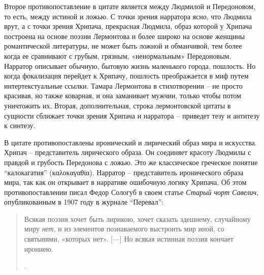 \documentclass[12pt,a4paper]{article}
\begin{document}
Второе противопоставление в цитате является между Людмилой и Передоновом, то есть, между истиной и ложью. С точки зрения нарратора ясно, что Людмила врут, а с точки зрения Хрипача, прекрасная Людмила, образ которой у Хрипача построена на основе поэзии Лермонтова и более широко на основе женщины романтической литературы, не может быть ложной и обманчивой, тем более когда ее сравнивают с грубым, грязным, «ненормальным» Передоновым. Нарратор описывает обычную, бытовую жизнь маленького города, пошлость. Но когда фокализация перейдет к Хрипачу, пошлость преображается в миф путем интертекстуальные ссылки. Тамара Лермонтова в стихотворении – не просто красивая, но также коварная, и она заманивает мужчин, только чтобы потом уничтожить их. Вторая, дополнительная, строка лермонтовской цитаты в сущности сближает точки зрения Хрипача и нарратора – приведет тезу и антитезу к синтезу.  




В цитате противопоставлены иронический и лирический образ мира и искусства. Хрипач – представитель лирического образа. Он соединяет красоту Людмилы с правдой и грубость Передонова с ложью. Это же классическое греческое понятие \enquote{калокагатия} (\foreignlanguage{greek}{καλοκαγαθία}).  Нарратор – представитель иронического образа мира, так как он открывает в нарративе ошибочную логику Хрипача. Об этом противопоставлении писал Федор Сологуб в своем статье \textit{Старый чорт Савелич}, опубликованным в 1907 году в журнале \enquote{Перевал}:  

\begin{quote}
Всякая поэзия хочет быть лирикою, хочет сказать здешнему,
случайному миру \textit{нет}, и из элементов познаваемого выстроить
мир иной, со святынями, «которых нет».
[---]
Но всякая истинная поэзия кончает ирониею.

\parencite[164]{sologub1991}.
\end{quote}
\end{document}
